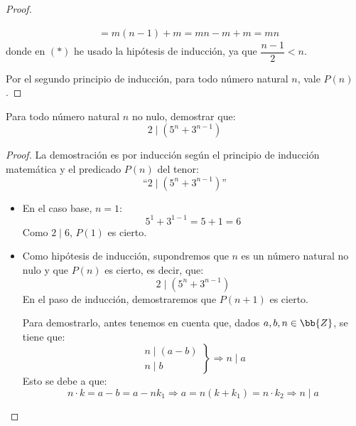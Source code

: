 \begin{ejercicio}
\begin{proof}
\begin{itemize}
\begin{enumerate}
\begin{align*}
                                    &= m(n-1)+m = mn-m+m = mn
                        \end{align*}
                        donde en $(\ast)$ he usado la hipótesis de inducción, ya que $\dfrac{n-1}{2} < n$.
                \end{enumerate}
        \end{itemize}
        Por el segundo principio de inducción, para todo número natural $n$, vale $P(n)$.
    \end{proof}
\end{ejercicio}



\begin{ejercicio}\label{ej:2dividea}
    Para todo número natural $n$ no nulo, demostrar que:
    $$2\mid \left(5^n + 3^{n-1}\right)$$

    \begin{proof}
        La demostración es por inducción según el principio de inducción matemática y el predicado $P(n)$ del tenor:
        $$\text{``}2\mid \left(5^n + 3^{n-1}\right)\text{''}$$

        \begin{itemize}
            \item En el caso base, $n=1$:
                $$5^1 + 3^{1-1} = 5+1 = 6$$
                Como $2\mid 6$, $P(1)$ es cierto.

            \item Como hipótesis de inducción, supondremos que $n$ es un número natural no nulo y que $P(n)$ es cierto, es decir, que:
                $$2\mid \left(5^n + 3^{n-1}\right)$$
                En el paso de inducción, demostraremos que $P(n+1)$ es cierto.

                Para demostrarlo, antes tenemos en cuenta que, dados $a,b,n\in \bb{Z}$, se tiene que:
                \begin{equation*}
                    \left.\begin{array}{l}
                        n\mid (a-b) \\
                        n\mid b
                    \end{array} \right\} \Longrightarrow n\mid a
                \end{equation*}
                Esto se debe a que:
                \begin{equation*}
                    n\cdot k = a-b = a-nk_1 \Longrightarrow a = n(k+k_1) = n\cdot k_2 \Longrightarrow n\mid a
                \end{equation*}


\end{itemize}
\end{proof}
\end{ejercicio}
